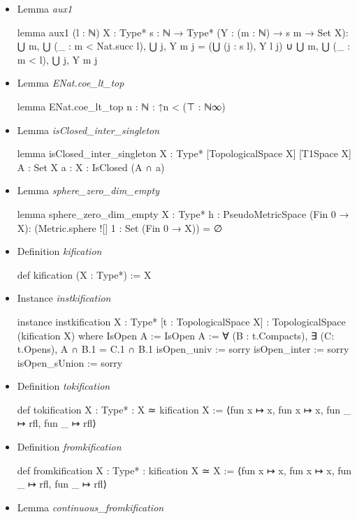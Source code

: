 \documentclass[colorinlistoftodos]{article}
\begin{document}
\begin{itemize}
  \item Lemma \emph{aux1}
\begin{leancode}
lemma aux1 (l : ℕ) {X : Type*} {s : ℕ →  Type*} (Y : (m : ℕ) → s m → Set X):
    ⋃ m, ⋃ (_ : m < Nat.succ l), ⋃ j, Y m j = 
    (⋃ (j : s l), Y l j) ∪ ⋃ m, ⋃ (_ : m < l), ⋃ j, Y m j
\end{leancode}
  \item Lemma \emph{ENat.coe\_lt\_top}
\begin{leancode}
lemma ENat.coe_lt_top {n : ℕ} : ↑n < (⊤ : ℕ∞)
\end{leancode}
  \item Lemma \emph{isClosed\_inter\_singleton}
\begin{leancode}
lemma isClosed_inter_singleton {X : Type*} [TopologicalSpace X] [T1Space X] {A : Set X} 
{a : X} : IsClosed (A ∩ {a})
\end{leancode}
  \item Lemma \emph{sphere\_zero\_dim\_empty}
\begin{leancode}
lemma sphere_zero_dim_empty {X : Type*} {h : PseudoMetricSpace (Fin 0 → X)}:
  (Metric.sphere ![] 1 : Set (Fin 0 → X)) = ∅
\end{leancode}
  \item Definition \emph{kification}
\begin{leancode}
def kification (X : Type*) := X
\end{leancode}
  \item Instance \emph{instkification}
\begin{leancode}
instance instkification {X : Type*} [t : TopologicalSpace X] : 
TopologicalSpace (kification X) where
  IsOpen A := IsOpen A := ∀ (B : t.Compacts), ∃ (C: t.Opens), A ∩ B.1 = C.1 ∩ B.1
  isOpen_univ := sorry
  isOpen_inter := sorry
  isOpen_sUnion := sorry
\end{leancode}
  \item Definition \emph{tokification}
\begin{leancode}
def tokification {X : Type*} : X ≃ kification X := 
⟨fun x ↦ x, fun x ↦ x, fun _ ↦ rfl, fun _ ↦ rfl⟩
\end{leancode}
  \item Definition \emph{fromkification}
\begin{leancode}
def fromkification {X : Type*} : kification X ≃ X := 
⟨fun x ↦ x, fun x ↦ x, fun _ ↦ rfl, fun _ ↦ rfl⟩
\end{leancode}
  \item Lemma \emph{continuous\_fromkification}

\end{itemize}
\end{document}
